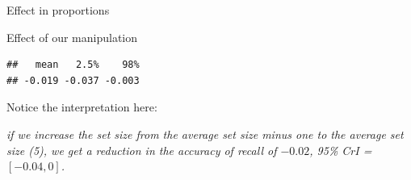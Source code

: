 \documentclass[12pt,ignorenonframetext,aspectratio=169]{beamer}
\newenvironment{Shaded}{\begin{snugshade}}{\end{snugshade}}
\newcommand{\DataTypeTok}[1]{\textcolor[rgb]{0.13,0.29,0.53}{#1}}
\newcommand{\DecValTok}[1]{\textcolor[rgb]{0.00,0.00,0.81}{#1}}
\newcommand{\FloatTok}[1]{\textcolor[rgb]{0.00,0.00,0.81}{#1}}
\newcommand{\KeywordTok}[1]{\textcolor[rgb]{0.13,0.29,0.53}{\textbf{#1}}}
\newcommand{\NormalTok}[1]{#1}
\newcommand{\OperatorTok}[1]{\textcolor[rgb]{0.81,0.36,0.00}{\textbf{#1}}}
\newcommand{\StringTok}[1]{\textcolor[rgb]{0.31,0.60,0.02}{#1}}
\begin{document}
\begin{frame}[fragile]{Effect in proportions}
\protect\hypertarget{effect-in-proportions-1}{}

Effect of our manipulation

\scriptsize

\begin{Shaded}
\end{Shaded}

\begin{verbatim}
##   mean   2.5%    98% 
## -0.019 -0.037 -0.003
\end{verbatim}

\normalsize

Notice the interpretation here:

\emph{if we increase the set size from the average set size minus one to the average set size (5), we get a reduction in the accuracy of recall of \(-0.02\), 95\% CrI = \([ -0.04 , 0 ]\).}

\end{frame}
\end{document}
